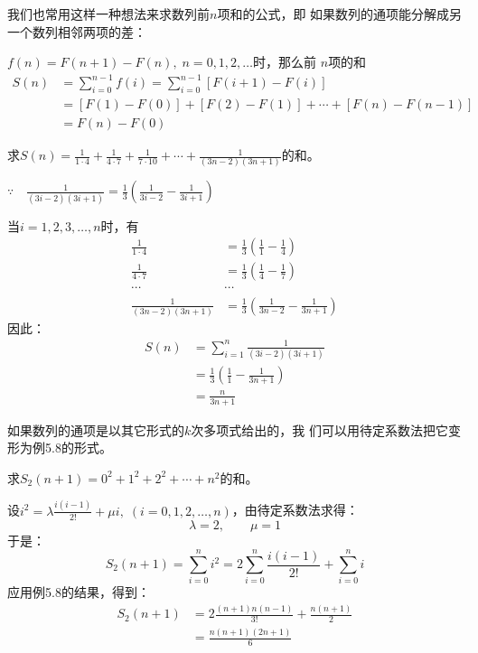 我们也常用这样一种想法来求数列前$n$项和的公式，即
如果数列的通项能分解成另一个数列相邻两项的差：

$f(n)=F(n+1)-F(n),\; n=0,1,2,\ldots$时，那么前
$n$项的和
\[\begin{split}
   S(n)&= \sum^{n-1}_{i=0} f(i)= \sum^{n-1}_{i=0} [F(i+1)-F(i)]\\
   &=[F(1)-F(0)]+[F(2)-F(1)]+\cdots +[F(n)-F(n-1)]\\
   &=F(n)-F(0)
\end{split}\]


\begin{example}
    求$S(n)=\frac{1}{1\cdot 4}+\frac{1}{4\cdot 7}+\frac{1}{7\cdot 10}+\cdots +\frac{1}{(3n-2)(3n+1)}$的和。
\end{example}

\begin{solution}
$\because\quad \frac{1}{(3i-2)(3i+1)}=\frac{1}{3}\left(\frac{1}{3i-2}-\frac{1}{3i+1}\right)$

当$i=1,2,3,\ldots,n$时，有
\[\begin{split}
    \frac{1}{1\cdot 4}&=\frac{1}{3}\left(\frac{1}{1}-\frac{1}{4}\right)\\
    \frac{1}{4\cdot 7}&=\frac{1}{3}\left(\frac{1}{4}-\frac{1}{7}\right)\\
    \cdots &\cdots\\
    \frac{1}{(3n-2)(3n+1)}&=\frac{1}{3}\left(\frac{1}{3n-2}-\frac{1}{3n+1}\right)
\end{split}\]
因此：
\[\begin{split}
    S(n)&=\sum^n_{i=1}\frac{1}{(3i-2)(3i+1)}\\
    &=\frac{1}{3}\left(\frac{1}{1}-\frac{1}{3n+1}\right)\\
    &=\frac{n}{3n+1}
\end{split}\]
\end{solution}

如果数列的通项是以其它形式的$k$次多项式给出的，我
们可以用待定系数法把它变形为例5.8的形式。


\begin{example}
    求$S_2(n+1)=0^2+1^2+2^2+\cdots+n^2$的和。
\end{example}

\begin{solution}
    设$i^2=\lambda \frac{i(i-1)}{2!}+\mu i,\; (i=0,1,2,\ldots,n)$，由待定系数法求得：
\[\lambda=2,\qquad \mu=1\]
于是：
\[S_2(n+1)=\sum^n_{i=0}i^2=2\sum^n_{i=0}\frac{i(i-1)}{2!}+\sum^n_{i=0}i\]
应用例5.8的结果，得到：
\[\begin{split}
    S_2(n+1)&=2\frac{(n+1)n(n-1)}{3!}+\frac{n(n+1)}{2}\\
    &=\frac{n(n+1)(2n+1)}{6}
\end{split}\]
\end{solution}

